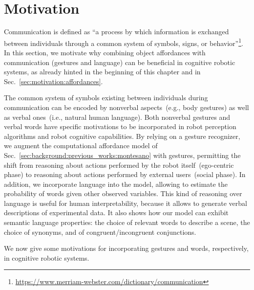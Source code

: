 \section{Motivation}
\label{sec:gestures:motivation}

Communication is defined as ``a process by which information is exchanged between individuals through a common system of symbols, signs, or behavior''\footnote{\url{https://www.merriam-webster.com/dictionary/communication}}.
In this section, we motivate why combining object affordances with communication (gestures and language) can be beneficial in cognitive robotic systems, as already hinted in the beginning of this chapter and in Sec.~\ref{sec:motivation:affordances}.

The common system of symbols existing between individuals during communication can be encoded by nonverbal aspects~(e.g., body gestures) as well as verbal ones~(i.e., natural human language).
Both nonverbal gestures and verbal words have specific motivations to be incorporated in robot perception algorithms and robot cognitive capabilities.
By relying on a gesture recognizer,
we augment the computational affordance model of Sec.~\ref{sec:background:previous_works:montesano} with gestures, permitting the shift from reasoning about actions performed by the robot itself~(ego-centric phase) to reasoning about actions performed by external users~(social phase).
In addition, we incorporate language into the model, allowing to estimate the probability of words given other observed variables.
This kind of reasoning over language is useful for human interpretability, because it allows to generate verbal descriptions of experimental data.
It also shows how our model can exhibit semantic language properties:
the choice of relevant words to describe a scene,
the choice of synonyms,
and of congruent/incongruent conjunctions.

We now give some motivations for incorporating gestures and words, respectively, in cognitive robotic systems.

